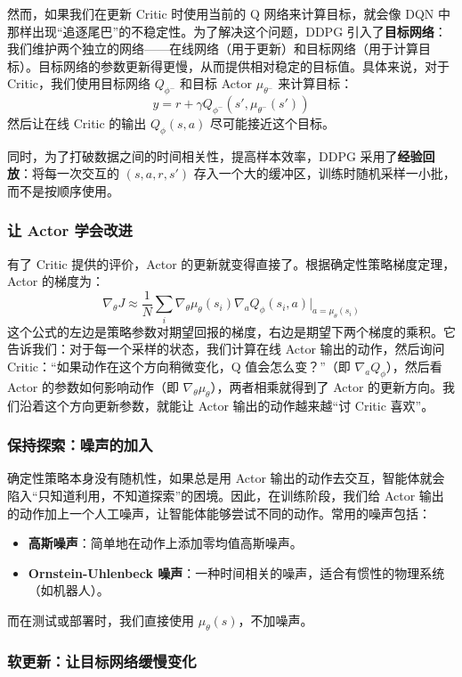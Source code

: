 \documentclass[lang=cn,zihao=-4,a4paper,fontset=windows]{beautybook}
\begin{document}
然而，如果我们在更新 Critic 时使用当前的 Q 网络来计算目标，就会像 DQN 中那样出现“追逐尾巴”的不稳定性。为了解决这个问题，DDPG 引入了\textbf{目标网络}：我们维护两个独立的网络——在线网络（用于更新）和目标网络（用于计算目标）。目标网络的参数更新得更慢，从而提供相对稳定的目标值。具体来说，对于 Critic，我们使用目标网络 \(Q_{\phi^-}\) 和目标 Actor \(\mu_{\theta^-}\) 来计算目标：
\[
y = r + \gamma Q_{\phi^-}(s', \mu_{\theta^-}(s'))
\]
然后让在线 Critic 的输出 \(Q_\phi(s,a)\) 尽可能接近这个目标。

同时，为了打破数据之间的时间相关性，提高样本效率，DDPG 采用了\textbf{经验回放}：将每一次交互的 \((s, a, r, s')\) 存入一个大的缓冲区，训练时随机采样一小批，而不是按顺序使用。

\subsubsection{让 Actor 学会改进}

有了 Critic 提供的评价，Actor 的更新就变得直接了。根据确定性策略梯度定理，Actor 的梯度为：
\[
\nabla_\theta J \approx \frac{1}{N} \sum_i \nabla_\theta \mu_\theta(s_i) \nabla_a Q_\phi(s_i, a) \big|_{a = \mu_\theta(s_i)}
\]
这个公式的左边是策略参数对期望回报的梯度，右边是期望下两个梯度的乘积。它告诉我们：对于每一个采样的状态，我们计算在线 Actor 输出的动作，然后询问 Critic：“如果动作在这个方向稍微变化，Q 值会怎么变？”（即 \(\nabla_a Q_\phi\)），然后看 Actor 的参数如何影响动作（即 \(\nabla_\theta \mu_\theta\)），两者相乘就得到了 Actor 的更新方向。我们沿着这个方向更新参数，就能让 Actor 输出的动作越来越“讨 Critic 喜欢”。

\subsubsection{保持探索：噪声的加入}

确定性策略本身没有随机性，如果总是用 Actor 输出的动作去交互，智能体就会陷入“只知道利用，不知道探索”的困境。因此，在训练阶段，我们给 Actor 输出的动作加上一个人工噪声，让智能体能够尝试不同的动作。常用的噪声包括：
\begin{itemize}
    \item \textbf{高斯噪声}：简单地在动作上添加零均值高斯噪声。
    \item \textbf{Ornstein-Uhlenbeck 噪声}：一种时间相关的噪声，适合有惯性的物理系统（如机器人）。
\end{itemize}
而在测试或部署时，我们直接使用 \(\mu_\theta(s)\)，不加噪声。

\subsubsection{软更新：让目标网络缓慢变化}
\end{document}
